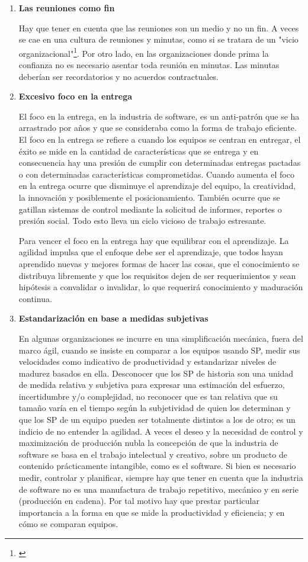 \begin{enumerate}
\item \textbf{Las reuniones como fin}

Hay que tener en cuenta que las reuniones son un medio y no un fin. A veces se cae en una cultura de reuniones y minutas, como si se tratara de un "vicio organizacional"\footnote{\cite{UNTREF-2014}}. Por otro lado, en las organizaciones donde prima la confianza no es necesario asentar toda reunión en minutas. Las minutas deberían ser recordatorios y no acuerdos contractuales.

\item \textbf{Excesivo foco en la entrega}

El foco en la entrega, en la industria de software, es un anti-patrón que se ha arrastrado por años y que se consideraba como la forma de trabajo eficiente. El foco en la entrega se refiere a cuando los equipos se centran en entregar, el éxito se mide en la cantidad de características que se entrega y en consecuencia hay una presión de cumplir con determinadas entregas pactadas o con determinadas características comprometidas. Cuando aumenta el foco en la entrega ocurre que disminuye el aprendizaje del equipo, la creatividad, la innovación y posiblemente el posicionamiento. También ocurre que se gatillan sistemas de control mediante la solicitud de informes, reportes o presión social. Todo esto lleva un ciclo vicioso de trabajo estresante.

Para vencer el foco en la entrega hay que equilibrar con el aprendizaje. La agilidad impulsa que el enfoque debe ser el aprendizaje, que todos hayan aprendido nuevas y mejores formas de hacer las cosas, que el conocimiento se distribuya libremente y que los requisitos dejen de ser requerimientos y sean hipótesis a convalidar o invalidar, lo que requerirá conocimiento y maduración continua.

\item \textbf{Estandarización en base a medidas subjetivas}

En algunas organizaciones se incurre en una simplificación mecánica, fuera del marco ágil, cuando se insiste en comparar a los equipos usando SP, medir sus velocidades como indicativo de productividad y estandarizar niveles de madurez basados en ella. 
Desconocer que los SP de historia son una unidad de medida relativa y subjetiva para expresar una estimación del esfuerzo, incertidumbre y/o complejidad, no reconocer que es tan relativa que su tamaño varía en el tiempo según la subjetividad de quien los determinan y que los SP de un equipo pueden ser totalmente distintos a los de otro; es un indicio de no entender la agilidad. A veces el deseo y la necesidad de control y maximización de producción nubla la concepción de que la industria de software se basa en el trabajo intelectual y creativo, sobre un producto de contenido prácticamente intangible, como es el software. Si bien es necesario medir, controlar y planificar, siempre hay que tener en cuenta que la industria de software no es una manufactura de trabajo repetitivo, mecánico y en serie (producción en cadena). Por tal motivo hay que prestar particular importancia a la forma en que se mide la productividad y eficiencia; y en cómo se comparan equipos.


\end{enumerate}
